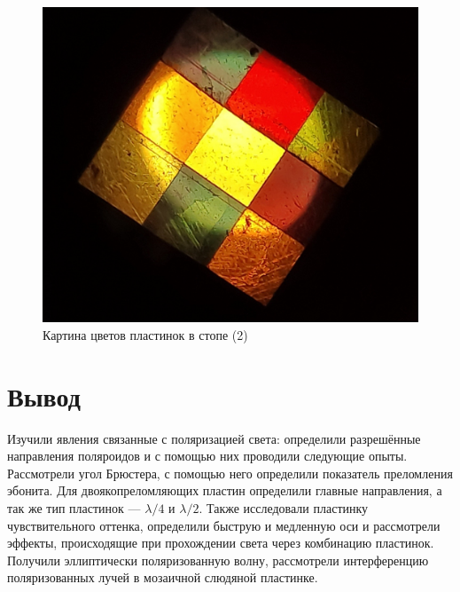 \documentclass[a4paper, 12pt]{article}%
\begin{document}
\begin{enumerate}
\begin{figure}[h!]
\begin{center}
\begin{minipage}[h!]{0.48\linewidth}
                \includegraphics[width=1\linewidth]{images/stopa_2.jpg}
                \caption{Картина цветов пластинок в стопе (2)}
                \label{picture_3}
            \end{minipage}
        \end{center}
    \end{figure}

\end{enumerate}

\section*{Вывод}
Изучили явления связанные с поляризацией света: определили разрешённые направления поляроидов и с помощью них проводили следующие опыты. Рассмотрели угол Брюстера, с помощью него определили показатель преломления эбонита. Для двоякопреломляющих пластин определили главные направления, а так же тип пластинок --- $\lambda /4$ и $\lambda/2$. Также исследовали пластинку чувствительного оттенка, определили быструю и медленную оси и рассмотрели эффекты, происходящие при прохождении света через комбинацию пластинок. Получили эллиптически поляризованную волну, рассмотрели интерференцию поляризованных лучей в мозаичной слюдяной пластинке.
\end{document}
